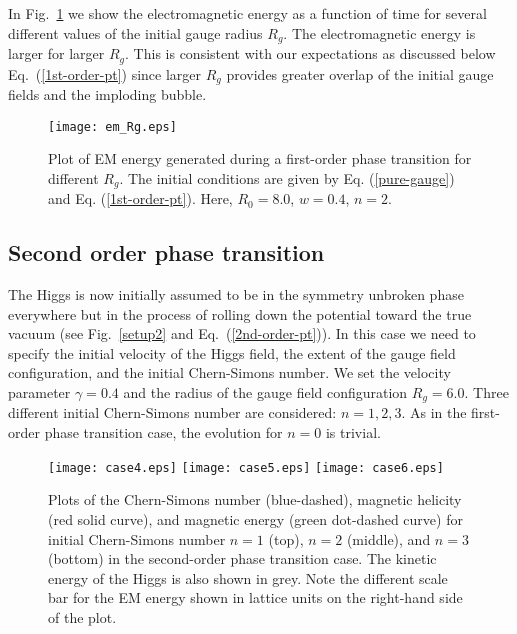 \documentclass[prd,twocolumn,nofootinbib]{revtex4-1}
\begin{document}
In Fig.~\ref{em_rg} we show the electromagnetic energy as a function of time for several
different values of the initial gauge radius $R_g$. The electromagnetic energy is larger for 
larger $R_g$. This is consistent with our expectations as discussed below Eq.~(\ref{1st-order-pt})
since larger $R_g$ provides greater overlap of the initial gauge fields and the
imploding bubble.

\begin{figure}
	\texttt{[image: em\_Rg.eps]}
	\caption{Plot of EM energy generated during a first-order phase transition
		for different $R_g$. The initial conditions are given by Eq. (\ref{pure-gauge}) 
		and Eq. (\ref{1st-order-pt}). Here, $R_0=8.0$, $w=0.4$, $n=2$. }
	\label{em_rg}
\end{figure}




\subsection{Second order phase transition}
\label{secondorder}

The Higgs is now initially assumed to be in the symmetry unbroken phase everywhere
but in the process of rolling down the potential toward the true vacuum (see Fig.~\ref{setup2}
and Eq.~(\ref{2nd-order-pt})).
In this case we need to specify the initial velocity of the Higgs field, the extent of the gauge
field configuration, and the initial Chern-Simons number. We set the velocity parameter
$\gamma=0.4$ and the radius of the gauge field configuration $R_g=6.0$.
Three different initial Chern-Simons number are considered: $n=1,2,3$. As in the first-order
phase transition case, the evolution for $n=0$ is trivial.

\begin{figure}
\texttt{[image: case4.eps]}
\texttt{[image: case5.eps]}
\texttt{[image: case6.eps]}
  \caption{Plots of the Chern-Simons number (blue-dashed),
  magnetic helicity (red solid curve), and magnetic energy (green dot-dashed curve)
  for initial Chern-Simons number $n=1$ (top), $n=2$ (middle), and $n=3$ (bottom)
  in the second-order phase transition case. The kinetic energy of the Higgs is
  also shown in grey.
  Note the different scale bar for the EM energy shown in lattice units
  on the right-hand side of the plot.
}
\label{case-d-pic}
\end{figure}
\end{document}
